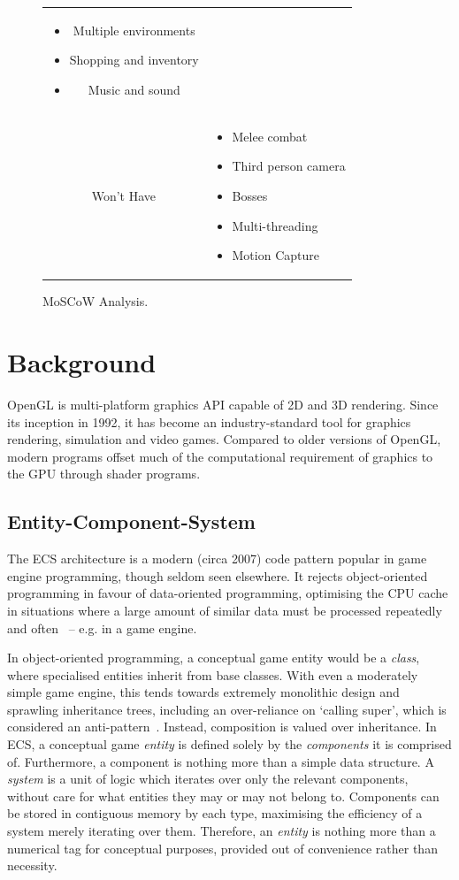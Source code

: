 \documentclass[a4paper, oneside, 11pt]{report}
\begin{document}
\begin{figure}[H]
\begin{tabular}{c||p{}}
\begin{itemize}
			\item Multiple environments
			\item Shopping and inventory
			\item Music and sound
		\end{itemize} \\
		Won't Have & \begin{itemize}
			\itemsep0em		
			\item Melee combat
			\item Third person camera
			\item Bosses
			\item Multi-threading
			\item Motion Capture
		\end{itemize} \\
	\end{tabular}
	\caption{MoSCoW Analysis. \label{moscow-1}}
\end{figure}

\chapter{Background}
OpenGL is multi-platform graphics API capable of 2D and 3D rendering. Since its inception in 1992, it has become an industry-standard tool for graphics rendering, simulation and video games. Compared to older versions of OpenGL, modern programs offset much of the computational requirement of graphics to the GPU through shader programs.

\section{Entity-Component-System}\label{section-ecs}
The ECS architecture is a modern (circa 2007) code pattern popular in game engine programming, though seldom seen elsewhere. It rejects object-oriented programming in favour of data-oriented programming, optimising the CPU cache in situations where a large amount of similar data must be processed repeatedly and often~\cite{tmachine} -- e.g. in a game engine.

In object-oriented programming, a conceptual game entity would be a \emph{class}, where specialised entities inherit from base classes. With even a moderately simple game engine, this tends towards extremely monolithic design and sprawling inheritance trees, including an over-reliance on `calling super', which is considered an anti-pattern~\cite{fowler}. Instead, composition is valued over inheritance. In ECS, a conceptual game \emph{entity} is defined solely by the \emph{components} it is comprised of. Furthermore, a component is nothing more than a simple data structure. A \emph{system} is a unit of logic which iterates over only the relevant components, without care for what entities they may or may not belong to. Components can be stored in contiguous memory by each type, maximising the efficiency of a system merely iterating over them. Therefore, an \emph{entity} is nothing more than a numerical tag for conceptual purposes, provided out of convenience rather than necessity.
\end{document}
